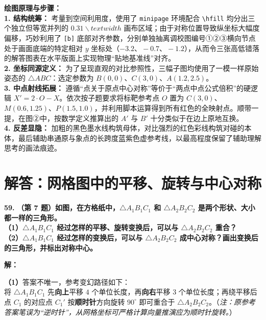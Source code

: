 \vspace{0.4cm}
{\small\color{blue!70!black}
\textbf{绘图原理与步骤：}\\
\textbf{1. 结构统筹：} 考量到空间利用度，使用了 \texttt{minipage} 环境配合 \texttt{\textbackslash{}hfill} 均分出三个独立但等宽并列的 $0.31\backslash{}textwidth$ 画布区域；由于对称位置导致纵坐标大幅度偏移，巧妙利用了 \texttt{[b]} 底部对齐参数，分别单独抽离调校图编号①②③横向节点处于画面底端的特定相对 $y$ 坐标处（$-3.2、-0.7、-1.2$），从而令三张高低错落的解答图表在水平版面上实现物理“贴地基准线”对齐。\\
\textbf{2. 坐标同源定义：} 为了呈现直观的对比参照性，三幅子图均使用了一模一样原始姿态的 $\triangle ABC$：选定参数为 $B(0,0)$、$C(3,0)、A(1.2, 2.5)$。\\
\textbf{3. 中点射线拓展：} 遵循“点关于原点中心对称”等价于“两点中点公式倍积”的硬逻辑 $X'=2 \cdot O-X$。依次按子题要求将标靶参考点 $O$ 置为 $C(3,0)$、$M(0.6, 1.25)、P(1.5, 1.0)$，并利用脚本运算得到所有红色的全映射点。顺带一提，在图②中，按数学定义推算出的 $A'$ 与 $B'$ 十分类似于在边上原地互换。\\
\textbf{4. 反差显隐：} 加粗的黑色墨水线构筑母体，对比强烈的红色彩线构筑对碰的本体，最后辅助串通原与象点的长跨度蓝紫色虚参考线，以最高程度保留了辅助理解思考的画法痕迹。
}

\newpage



\section{解答：网格图中的平移、旋转与中心对称}

\vspace{0.6cm}

\textbf{\LARGE 59.} \textbf{（第 7 题）如图，在方格纸中，$\triangle A_1B_1C_1$ 和 $\triangle A_2B_2C_2$ 是两个形状、大小都一样的三角形。\\
（1）$\triangle A_1B_1C_1$ 经过怎样的平移、旋转变换后，可以与 $\triangle A_2B_2C_2$ 重合？\\
（2）$\triangle A_1B_1C_1$ 经过怎样的变换后，可以与 $\triangle A_2B_2C_2$ 成中心对称？画出变换后的三角形，并标出对称中心。}

\vspace{0.4cm}
\textbf{解：}

\textbf{（1）}答案不唯一，参考变幻路径如下：\\
将 $\triangle A_1B_1C_1$ 先\textbf{向上}平移 $4$ 个单位长度，再\textbf{向右}平移 $3$ 个单位长度；再绕平移后点 $C_1$ 的对应点 $C_1'$ 按\textbf{顺时针}方向旋转 $90^\circ$ 即可重合于 $\triangle A_2B_2C_2$。（\textit{注：原参考答案笔误为“逆时针”，从网格坐标可严格计算向量推演应为顺时针旋转。}）

